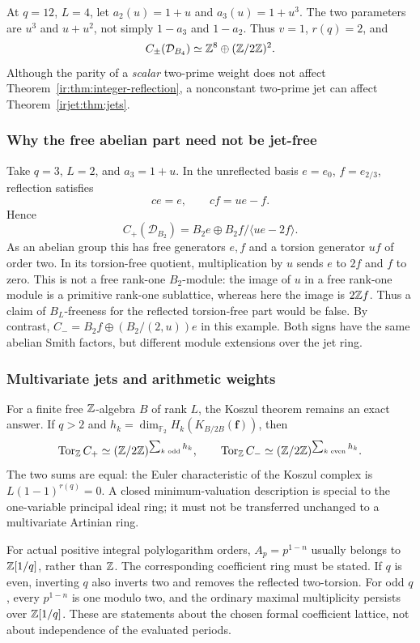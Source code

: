 \begin{example}
At $q=12$, $L=4$, let $a_2(u)=1+u$ and $a_3(u)=1+u^3$.
The two parameters are $u^3$ and $u+u^2$, not simply
$1-a_3$ and $1-a_2$. Thus $v=1$, $r(q)=2$, and
\[
 C_\pm(\mathcal D_{B_4})\simeq\mathbb{Z}^8\oplus(\mathbb{Z}/2\mathbb{Z})^2.
\]
Although the parity of a \emph{scalar} two-prime weight does not affect
Theorem~\ref{ir:thm:integer-reflection}, a nonconstant two-prime jet can affect
Theorem~\ref{irjet:thm:jets}.
\end{example}

\subsubsection{Why the free abelian part need not be jet-free}
Take $q=3$, $L=2$, and $a_3=1+u$. In the unreflected basis
$e=e_0$, $f=e_{2/3}$, reflection satisfies
\[
 ce=e,\qquad cf=ue-f.
\]
Hence
\begin{equation}
 C_+(\mathcal D_{B_2})=B_2e\oplus B_2f\big/\langle ue-2f\rangle.
 \label{irjet:eq:nonflat}
\end{equation}
As an abelian group this has free generators $e,f$ and a torsion generator
$uf$ of order two. In its torsion-free quotient, multiplication by $u$
sends $e$ to $2f$ and $f$ to zero. This is not a free rank-one
$B_2$-module: the image of $u$ in a free rank-one module is a primitive
rank-one sublattice, whereas here the image is $2\mathbb{Z} f$.
Thus a claim of $B_L$-freeness for the reflected torsion-free part would
be false. By contrast, $C_-=B_2f\oplus(B_2/(2,u))e$ in this example.
Both signs have the same abelian Smith factors, but different module
extensions over the jet ring.

\subsubsection{Multivariate jets and arithmetic weights}
For a finite free $\mathbb{Z}$-algebra $B$ of rank $L$, the Koszul theorem remains
an exact answer. If $q>2$ and
$h_k=\dim_{\mathbb F_2} H_k(K_{B/2B}(\boldsymbol f))$, then
\[
 \operatorname{Tor}_{\mathbb{Z}} C_+\simeq(\mathbb{Z}/2\mathbb{Z})^{\sum_{k\text{ odd}}h_k},\qquad
 \operatorname{Tor}_{\mathbb{Z}} C_-\simeq(\mathbb{Z}/2\mathbb{Z})^{\sum_{k\text{ even}}h_k}.
\]
The two sums are equal: the Euler characteristic of the Koszul complex
is $L(1-1)^{r(q)}=0$. A closed minimum-valuation description is special
to the one-variable principal ideal ring; it must not be transferred
unchanged to a multivariate Artinian ring.

For actual positive integral polylogarithm orders, $A_p=p^{1-n}$ usually
belongs to $\mathbb{Z}[1/q]$, rather than $\mathbb{Z}$. The corresponding coefficient
ring must be stated. If $q$ is even, inverting $q$ also inverts two and
removes the reflected two-torsion. For odd $q$, every $p^{1-n}$ is one
modulo two, and the ordinary maximal multiplicity persists over
$\mathbb{Z}[1/q]$. These are statements about the chosen formal coefficient
lattice, not about independence of the evaluated periods.
